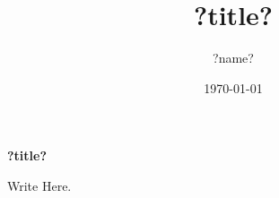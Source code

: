 \documentclass[letterpaper]{turabian-researchpaper}
\title{?title?}
\subtitle{}
\author{?name?}
\date{\today}
\begin{document}
\maketitle

\begin{center}
	\textbf{?title?}
\end{center}

Write Here.


\end{document}
